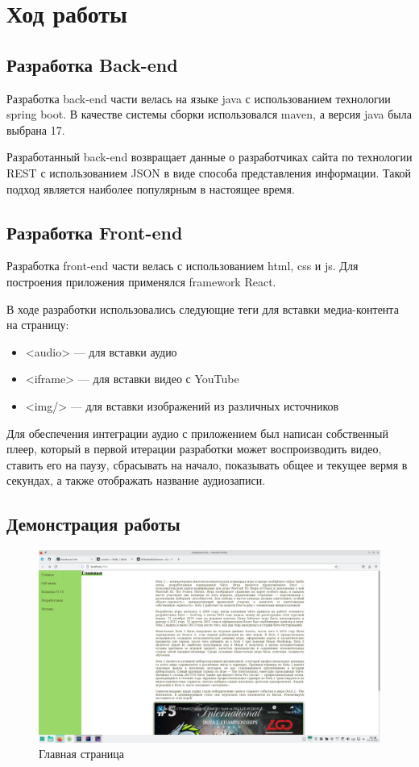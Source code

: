 \chapter{Ход работы}

\section{Разработка Back-end}
Разработка back-end части велась на языке java с использованием технологии spring boot. В качестве системы сборки использовался maven, а версия java была выбрана 17.

Разработанный back-end возвращает данные о разработчиках сайта по технологии REST с использованием JSON в виде способа представления информации. Такой подход является наиболее популярным в настоящее время.

\section{Разработка Front-end}
Разработка front-end части велась с использованием html, css и js. Для построения приложения применялся framework React.

В ходе разработки использовались следующие теги для вставки медиа-контента на страницу:
\begin{itemize}
	\item <audio> --- для вставки аудио
	\item <iframe> --- для вставки видео с YouTube
	\item <img/> --- для вставки изображений из различных источников
\end{itemize}

Для обеспечения интеграции аудио с приложением был написан собственный плеер, который в первой итерации разработки может воспроизводить видео, ставить его на паузу, сбрасывать на начало, показывать общее и текущее вермя в секундах, а также отображать название аудиозаписи.

\section{Демонстрация работы}

\begin{figure}[H]
	\centering
	\includegraphics[width=\linewidth]{01}
	\caption{Главная страница}
\end{figure}

